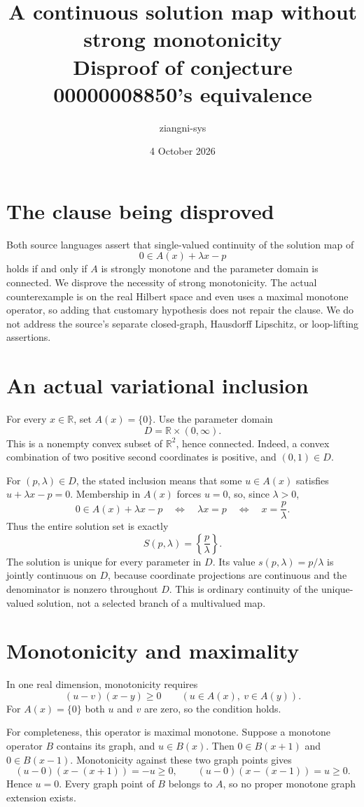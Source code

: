 \documentclass[11pt,a4paper]{article}
\title{A continuous solution map without strong monotonicity\\Disproof of conjecture 00000008850's equivalence}
\author{ziangni-sys}
\date{4 October 2026}
\begin{document}
\maketitle
\section*{The clause being disproved}
Both source languages assert that single-valued continuity of the solution map of
\[
 0\in A(x)+\lambda x-p
\]
holds if and only if $A$ is strongly monotone and the parameter domain is connected. We disprove the necessity of strong monotonicity. The actual counterexample is on the real Hilbert space and even uses a maximal monotone operator, so adding that customary hypothesis does not repair the clause. We do not address the source's separate closed-graph, Hausdorff Lipschitz, or loop-lifting assertions.

\section*{An actual variational inclusion}
For every $x\in\mathbb R$, set $A(x)=\{0\}$. Use the parameter domain
\[
 D=\mathbb R\times(0,\infty).
\]
This is a nonempty convex subset of $\mathbb R^2$, hence connected. Indeed, a convex combination of two positive second coordinates is positive, and $(0,1)\in D$.

For $(p,\lambda)\in D$, the stated inclusion means that some $u\in A(x)$ satisfies $u+\lambda x-p=0$. Membership in $A(x)$ forces $u=0$, so, since $\lambda>0$,
\[
 0\in A(x)+\lambda x-p
 \quad\Longleftrightarrow\quad
 \lambda x=p
 \quad\Longleftrightarrow\quad
 x=\frac p\lambda.
\]
Thus the entire solution set is exactly
\[
 S(p,\lambda)=\left\{\frac p\lambda\right\}.
\]
The solution is unique for every parameter in $D$. Its value $s(p,\lambda)=p/\lambda$ is jointly continuous on $D$, because coordinate projections are continuous and the denominator is nonzero throughout $D$. This is ordinary continuity of the unique-valued solution, not a selected branch of a multivalued map.

\newpage
\section*{Monotonicity and maximality}
In one real dimension, monotonicity requires
\[
 (u-v)(x-y)\geq0\qquad(u\in A(x),\ v\in A(y)).
\]
For $A(x)=\{0\}$ both $u$ and $v$ are zero, so the condition holds.

For completeness, this operator is maximal monotone. Suppose a monotone operator $B$ contains its graph, and $u\in B(x)$. Then $0\in B(x+1)$ and $0\in B(x-1)$. Monotonicity against these two graph points gives
\[
 (u-0)(x-(x+1))=-u\geq0,\qquad
 (u-0)(x-(x-1))=u\geq0.
\]
Hence $u=0$. Every graph point of $B$ belongs to $A$, so no proper monotone graph extension exists.
\end{document}
